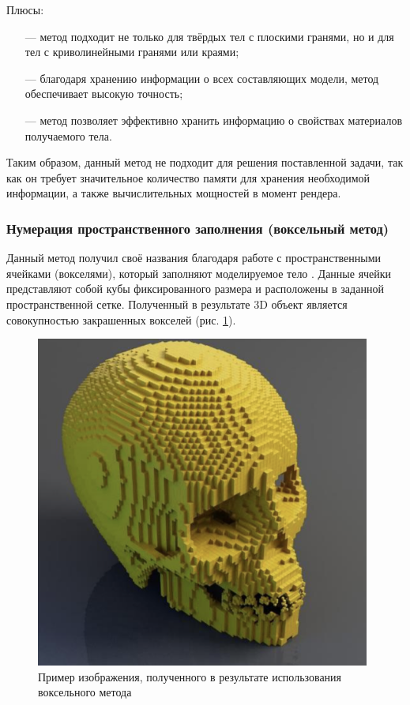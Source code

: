 Плюсы:
\begin{itemize}[leftmargin=1.6\parindent]
	\item[---] метод подходит не только для твёрдых тел с плоскими гранями, но и для 
	тел с криволинейными гранями или краями;
	\item[---] благодаря хранению информации о всех составляющих модели, метод 
	обеспечивает высокую точность;
	\item[---] метод позволяет эффективно хранить информацию о свойствах материалов получаемого тела.
\end{itemize}

Таким образом, данный метод не подходит для решения поставленной 
задачи, так как он требует значительное количество памяти для хранения 
необходимой информации, а также вычислительных мощностей в момент 
рендера.

\subsubsection{Нумерация пространственного заполнения (воксельный метод)} \label{sec:numeric}

Данный метод получил своё названия благодаря работе с 
пространственными ячейками (вокселями), который заполняют моделируемое 
тело \cite{numeric-octree}.
Данные ячейки представляют собой кубы фиксированного размера и 
расположены в заданной пространственной сетке.
Полученный в результате 3D 
объект является совокупностью закрашенных вокселей (рис. \ref{fig:numeric}). 

\begin{figure}[h]
	\centering
	\captionsetup{justification=centering}
	\includegraphics[width=110mm]{img/numeric.png}
	\caption{Пример изображения, полученного в результате 
		использования воксельного метода}
	\label{fig:numeric}
\end{figure}

